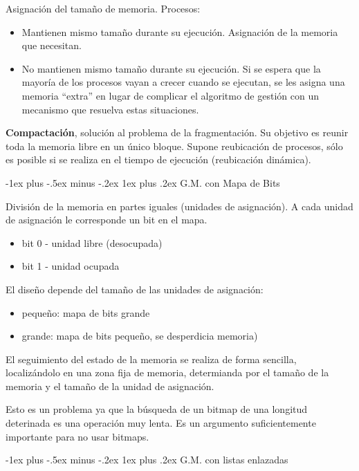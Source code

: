 \documentclass[10pt,portrait, twocolumn]{article}
\makeatletter
\renewcommand{\subsubsection}{\@startsection{subsubsection}{3}{0mm}%
                                {-1ex plus -.5ex minus -.2ex}%
                                {1ex plus .2ex}%
                                {\normalfont\small\bfseries}}
\makeatother
\begin{document}
Asignación del tamaño de memoria. Procesos:

	\begin{itemize}
	\item Mantienen mismo tamaño durante su ejecución. Asignación de la memoria que necesitan.
	\item No mantienen mismo tamaño durante su ejecución. Si se espera que la mayoría de los procesos vayan a crecer cuando se ejecutan, se les asigna una memoria ``extra'' en lugar de complicar el algoritmo de gestión con un mecanismo que resuelva estas situaciones.
	\end{itemize}

\textbf{Compactación}, solución al problema de la fragmentación. Su objetivo es reunir toda la memoria libre en un único bloque. Supone reubicación de procesos, sólo es posible si se realiza en el tiempo de ejecución (reubicación dinámica).
	
\subsubsection{G.M. con Mapa de Bits}

División de la memoria en partes iguales (unidades de asignación). A cada unidad de asignación le corresponde un bit en el mapa.

	\begin{itemize}
	\item bit 0 - unidad libre (desocupada)
	\item bit 1 - unidad ocupada
	\end{itemize}

El diseño depende del tamaño de las unidades de asignación:

	\begin{itemize}
	\item pequeño: mapa de bits grande
	\item grande: mapa de bits pequeño, se desperdicia memoria)
	\end{itemize}
 
 El seguimiento del estado de la memoria se realiza de forma sencilla, localizándolo en una zona fija de memoria, determianda por el tamaño de la memoria y el tamaño de la unidad de asignación.
 
 	\quad Esto es un problema ya que la búsqueda de un bitmap de una longitud deterinada es una operación muy lenta. Es un argumento suficientemente importante para no usar bitmaps.
 
 \subsubsection{G.M. con listas enlazadas}
 
\end{document}
